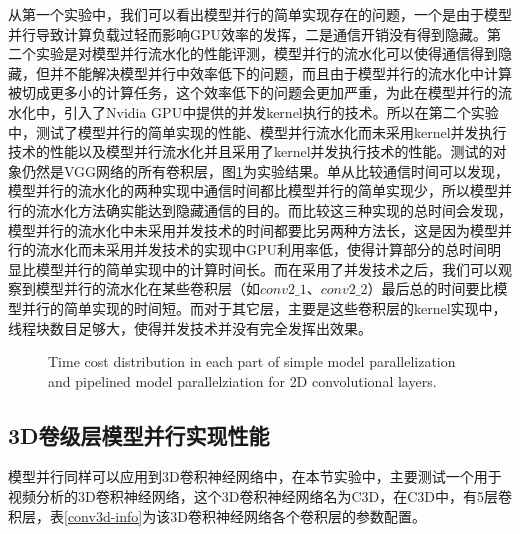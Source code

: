 从第一个实验中，我们可以看出模型并行的简单实现存在的问题，一个是由于模型并行导致计算负载过轻而影响GPU效率的发挥，二是通信开销没有得到隐藏。第二个实验是对模型并行流水化的性能评测，模型并行的流水化可以使得通信得到隐藏，但并不能解决模型并行中效率低下的问题，而且由于模型并行的流水化中计算被切成更多小的计算任务，这个效率低下的问题会更加严重，为此在模型并行的流水化中，引入了Nvidia GPU中提供的并发kernel执行的技术。所以在第二个实验中，测试了模型并行的简单实现的性能、模型并行流水化而未采用kernel并发执行技术的性能以及模型并行流水化并且采用了kernel并发执行技术的性能。测试的对象仍然是VGG网络的所有卷积层，图\ref{simpleAndPipelined}为实验结果。单从比较通信时间可以发现，模型并行的流水化的两种实现中通信时间都比模型并行的简单实现少，所以模型并行的流水化方法确实能达到隐藏通信的目的。而比较这三种实现的总时间会发现，模型并行的流水化中未采用并发技术的时间都要比另两种方法长，这是因为模型并行的流水化而未采用并发技术的实现中GPU利用率低，使得计算部分的总时间明显比模型并行的简单实现中的计算时间长。而在采用了并发技术之后，我们可以观察到模型并行的流水化在某些卷积层（如$conv2\_1$、$conv2\_2$）最后总的时间要比模型并行的简单实现的时间短。而对于其它层，主要是这些卷积层的kernel实现中，线程块数目足够大，使得并发技术并没有完全发挥出效果。

\begin{figure}[tbh]%
\centering
{}
\caption{Time cost distribution in each part of simple model parallelization and pipelined model parallelziation for 2D convolutional layers.}
\label{simpleAndPipelined}
\end{figure}

\subsection{3D卷级层模型并行实现性能}
模型并行同样可以应用到3D卷积神经网络中，在本节实验中，主要测试一个用于视频分析的3D卷积神经网络，这个3D卷积神经网络名为C3D，在C3D中，有5层卷积层，表\ref{conv3d-info}为该3D卷积神经网络各个卷积层的参数配置。

